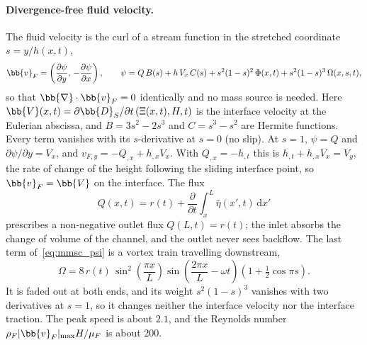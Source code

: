 \paragraph{Divergence-free fluid velocity.}
The fluid velocity is the curl of a stream function in the stretched coordinate $s = y/h(x,t)$,
\begin{equation}
  \bb{v}_F = \left(\frac{\partial\psi}{\partial y},\, -\frac{\partial\psi}{\partial x}\right), \qquad
  \psi = Q\,B(s) + h\,V_x\,C(s) + s^2(1-s)^2\,\Phi(x,t) + s^2(1-s)^3\,\Omega(x,s,t),
  \label{eq:mmsc_psi}
\end{equation}
so that $\bb{\nabla}\cdot\bb{v}_F = 0$ identically and no mass source is needed.
Here $\bb{V}(x,t) = \partial\bb{D}_S/\partial t\,(\Xi(x,t), H, t)$ is the interface velocity at the Eulerian abscissa, and $B = 3s^2 - 2s^3$ and $C = s^3 - s^2$ are Hermite functions.
Every term vanishes with its $s$-derivative at $s = 0$ (no slip).
At $s = 1$, $\psi = Q$ and $\partial\psi/\partial y = V_x$, and $v_{F,y} = -Q_{,x} + h_{,x}V_x$.
With $Q_{,x} = -h_{,t}$ this is $h_{,t} + h_{,x}V_x = V_y$, the rate of change of the height following the sliding interface point, so $\bb{v}_F = \bb{V}$ on the interface.
The flux
\begin{equation}
  Q(x,t) = r(t) + \frac{\partial}{\partial t}\int_x^L \hat\eta(x',t)\,\mathrm{d}x'
  \label{eq:mmsc_Q}
\end{equation}
prescribes a non-negative outlet flux $Q(L,t) = r(t)$; the inlet absorbs the change of volume of the channel, and the outlet never sees backflow.
The last term of~\eqref{eq:mmsc_psi} is a vortex train travelling downstream,
\begin{equation}
  \Omega = 8\,r(t)\,\sin^2\!\left(\frac{\pi x}{L}\right)\sin\!\left(\frac{2\pi x}{L} - \omega t\right)\left(1 + \tfrac{1}{2}\cos\pi s\right).
\end{equation}
It is faded out at both ends, and its weight $s^2(1-s)^3$ vanishes with two derivatives at $s = 1$, so it changes neither the interface velocity nor the interface traction.
The peak speed is about $2.1$, and the Reynolds number $\rho_F |\bb{v}_F|_{\max} H/\mu_F$ is about $200$.

